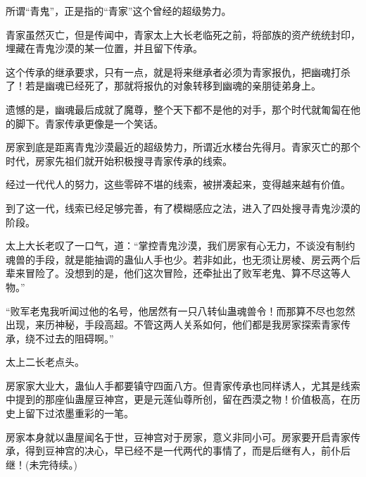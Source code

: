 \begin{this_body}
所谓“青鬼”，正是指的“青家”这个曾经的超级势力。

青家虽然灭亡，但是传闻中，青家太上大长老临死之前，将部族的资产统统封印，埋藏在青鬼沙漠的某一位置，并且留下传承。

这个传承的继承要求，只有一点，就是将来继承者必须为青家报仇，把幽魂打杀了！若是幽魂已经死了，那就将报仇的对象转移到幽魂的亲朋徒弟身上。

遗憾的是，幽魂最后成就了魔尊，整个天下都不是他的对手，那个时代就匍匐在他的脚下。青家传承更像是一个笑话。

房家到底是距离青鬼沙漠最近的超级势力，所谓近水楼台先得月。青家灭亡的那个时代，房家先祖们就开始积极搜寻青家传承的线索。

经过一代代人的努力，这些零碎不堪的线索，被拼凑起来，变得越来越有价值。

到了这一代，线索已经足够完善，有了模糊感应之法，进入了四处搜寻青鬼沙漠的阶段。

太上大长老叹了一口气，道：“掌控青鬼沙漠，我们房家有心无力，不谈没有制约魂兽的手段，就是能抽调的蛊仙人手也少。若非如此，也无须让房棱、房云两个后辈来冒险了。没想到的是，他们这次冒险，还牵扯出了败军老鬼、算不尽这等人物。”

“败军老鬼我听闻过他的名号，他居然有一只八转仙蛊魂兽令！而那算不尽也忽然出现，来历神秘，手段高超。不管这两人关系如何，他们都是我房家探索青家传承，绕不过去的阻碍啊。”

太上二长老点头。

房家家大业大，蛊仙人手都要镇守四面八方。但青家传承也同样诱人，尤其是线索中提到的那座仙蛊屋豆神宫，更是元莲仙尊所创，留在西漠之物！价值极高，在历史上留下过浓墨重彩的一笔。

房家本身就以蛊屋闻名于世，豆神宫对于房家，意义非同小可。房家要开启青家传承，得到豆神宫的决心，早已经不是一代两代的事情了，而是后继有人，前仆后继！(未完待续。)

\end{this_body}

